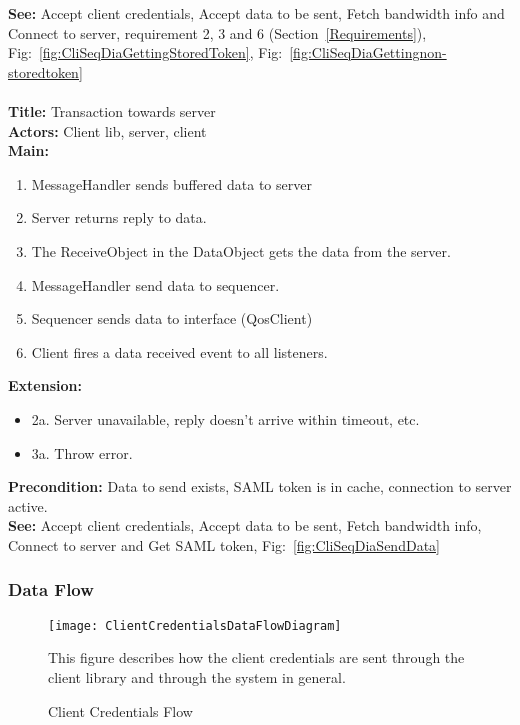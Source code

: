 		\textbf{See:} Accept client credentials, Accept data to be sent, Fetch bandwidth info and Connect to server, requirement 2, 3 and 6 (Section~\ref{Requirements}), Fig:~\ref{fig:CliSeqDiaGettingStoredToken}, Fig:~\ref{fig:CliSeqDiaGettingnon-storedtoken}
		\\\\
		\textbf{Title:} Transaction towards server \\
		\textbf{Actors:} Client lib, server, client \\
		\textbf{Main:}
		\begin{enumerate}
			\item MessageHandler sends buffered data to server
			\item Server returns reply to data.
			\item The ReceiveObject in the DataObject gets the data from the server.
			\item MessageHandler send data to sequencer.
			\item Sequencer sends data to interface (QosClient)
			\item Client fires a data received event to all listeners.
		\end{enumerate}
		\textbf{Extension:}
		\begin{itemize}
			 \item[] 2a. Server unavailable, reply doesn't arrive within timeout, etc.
			 \item[] 3a. Throw error.
		\end{itemize}
		\textbf{Precondition:} Data to send exists, SAML token is in cache, connection to server active.\\
		\textbf{See:} Accept client credentials, Accept data to be sent, Fetch bandwidth info, Connect to server and Get SAML token, Fig:~\ref{fig:CliSeqDiaSendData}
		
	\subsubsection{Data Flow}\label{textual client data flow}
        
    \begin{figure}[h]
        \centering
        \texttt{[image: ClientCredentialsDataFlowDiagram]}
        \caption{Client Credentials Flow}
        This figure describes how the client credentials are sent through the client library and through the system in general. 
        \label{fig:ClientCredentialsDataFlowDiagram}
    \end{figure}
    
